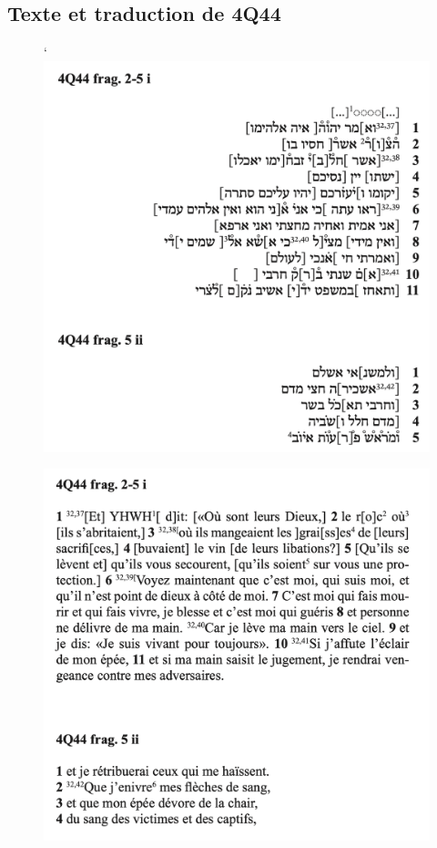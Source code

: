 \documentclass[11pt,a4paper]{article}
\begin{document}
\subsection{Texte et traduction de 4Q44}
\begin{figure}[!h]
    \begin{minipage}[c]{.46\linewidth}
        \centering`
        \includegraphics[width=1\linewidth]{img/4Q44/4Q44_1.png}
    \end{minipage}
    \hfill%
    \begin{minipage}[c]{.46\linewidth}
        \centering
        \includegraphics[width=1\linewidth]{img/4Q44/4Q44_trans_1.png}
    \end{minipage}
\end{figure}
\end{document}
